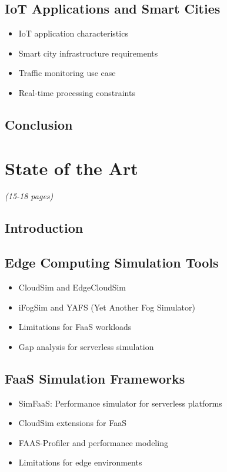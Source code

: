 \documentclass[12pt,a4paper]{report}
\begin{document}
\section{IoT Applications and Smart Cities}
\begin{itemize}[leftmargin=1cm]
    \item IoT application characteristics
    \item Smart city infrastructure requirements
    \item Traffic monitoring use case
    \item Real-time processing constraints
\end{itemize}

\section{Conclusion}


\chapter{State of the Art}
\textit{(15-18 pages)}

\section{Introduction}

\section{Edge Computing Simulation Tools}
\begin{itemize}[leftmargin=1cm]
    \item CloudSim and EdgeCloudSim
    \item iFogSim and YAFS (Yet Another Fog Simulator)
    \item Limitations for FaaS workloads
    \item Gap analysis for serverless simulation
\end{itemize}

\section{FaaS Simulation Frameworks}
\begin{itemize}[leftmargin=1cm]
    \item SimFaaS: Performance simulator for serverless platforms
    \item CloudSim extensions for FaaS
    \item FAAS-Profiler and performance modeling
    \item Limitations for edge environments
\end{itemize}
\end{document}
